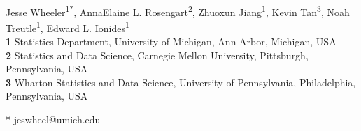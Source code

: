 \documentclass[10pt,letterpaper]{article}\usepackage[]{graphicx}\usepackage[table]{xcolor}
\begin{document}
\vspace*{0.2in}

\begin{flushleft}
{\Large
\textbf{} %
}
\newline
\\
Jesse Wheeler\textsuperscript{1*},
AnnaElaine L. Rosengart\textsuperscript{2},
Zhuoxun Jiang\textsuperscript{1},
Kevin Tan\textsuperscript{3},
Noah Treutle\textsuperscript{1},
Edward L. Ionides\textsuperscript{1}
\\
\bigskip
\textbf{1} Statistics Department, University of Michigan, Ann Arbor, Michigan, USA
\\
\textbf{2} Statistics and Data Science, Carnegie Mellon University, Pittsburgh, Pennsylvania, USA
\\
\textbf{3} Wharton Statistics and Data Science, University of Pennsylvania, Philadelphia, Pennsylvania, USA
\\
\bigskip

%
%



* jeswheel@umich.edu

\end{flushleft}
\end{document}
